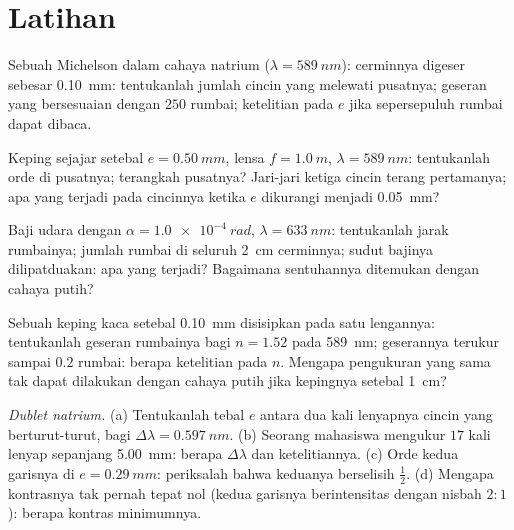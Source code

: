 \section{Latihan}

\begin{exercise}[$\star$]\label{exo:b2:michelson:1}
Sebuah Michelson dalam cahaya natrium ($\lambda = \qty{589}{nm}$): cerminnya digeser sebesar
\qty{0.10}{mm}: tentukanlah jumlah cincin yang melewati pusatnya; geseran
yang bersesuaian dengan $250$ rumbai; ketelitian pada $e$ jika sepersepuluh rumbai
dapat dibaca.
\end{exercise}

\begin{exercise}[$\star$]\label{exo:b2:michelson:2}
Keping sejajar setebal $e = \qty{0.50}{mm}$, lensa $f = \qty{1.0}{m}$, $\lambda =
\qty{589}{nm}$: tentukanlah orde di pusatnya; terangkah pusatnya? Jari-jari
ketiga cincin terang pertamanya; apa yang terjadi pada cincinnya ketika $e$ dikurangi
menjadi \qty{0.05}{mm}?
\end{exercise}

\begin{exercise}[$\star$]\label{exo:b2:michelson:3}
Baji udara dengan $\alpha = \qty{1.0e-4}{rad}$, $\lambda = \qty{633}{nm}$: tentukanlah jarak rumbainya;
jumlah rumbai di seluruh \qty{2}{cm} cerminnya; sudut bajinya
dilipatduakan: apa yang terjadi? Bagaimana sentuhannya ditemukan dengan cahaya putih?
\end{exercise}

\begin{exercise}[$\star$]\label{exo:b2:michelson:4}
Sebuah keping kaca setebal \qty{0.10}{mm} disisipkan pada satu lengannya: tentukanlah geseran rumbainya bagi
$n = 1.52$ pada \qty{589}{nm}; geserannya terukur sampai $0.2$ rumbai: berapa ketelitian
pada $n$. Mengapa pengukuran yang sama tak dapat dilakukan dengan cahaya putih
jika kepingnya setebal \qty{1}{cm}?
\end{exercise}

\begin{exercise}[$\star\star$]\label{exo:b2:michelson:5}
\emph{Dublet natrium.} (a) Tentukanlah tebal $e$ antara dua kali lenyapnya
cincin yang berturut-turut, bagi $\Delta\lambda = \qty{0.597}{nm}$. (b) Seorang mahasiswa
mengukur $17$ kali lenyap sepanjang \qty{5.00}{mm}: berapa $\Delta\lambda$ dan ketelitiannya.
(c) Orde kedua garisnya di $e = \qty{0.29}{mm}$: periksalah bahwa keduanya berselisih
$\tfrac12$. (d) Mengapa kontrasnya tak pernah tepat nol (kedua garisnya berintensitas
dengan nisbah $2 : 1$): berapa kontras minimumnya.
\end{exercise}

